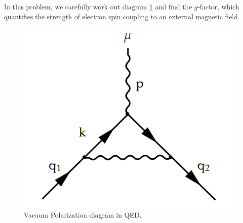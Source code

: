 \documentclass[11pt]{article}
\begin{document}

\begin{problem}
	In this problem, we carefully work out diagram \ref{ammom} and find the $g$-factor, which quantifies the strength of electron spin coupling to an external magnetic field.
	\begin{figure}[H]
		\centering
		\includegraphics[width=0.3\linewidth]{img/3.png}
		\caption{Vacuum Polarization diagram in QED.}
		\label{ammom}
	\end{figure}
	\end{problem}
\end{document}
